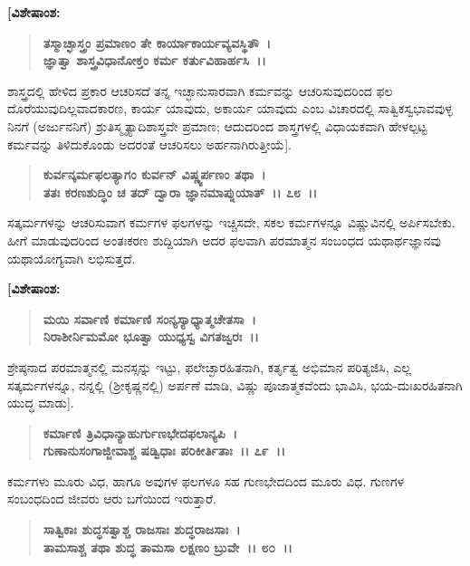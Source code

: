 \begin{flushleft}
\textbf{[ವಿಶೇಷಾಂಶ:} 
\end{flushleft}

\begin{verse}
\textbf{ತಸ್ಮಾಚ್ಛಾಸ್ತ್ರಂ ಪ್ರಮಾಣಂ ತೇ ಕಾರ್ಯಾಕಾರ್ಯವ್ಯವಸ್ಥಿತೌ~।}\\\textbf{ಜ್ಞಾತ್ವಾ ಶಾಸ್ತ್ರವಿಧಾನೋಕ್ತಂ ಕರ್ಮ ಕರ್ತುವಿಹಾರ್ಹಸಿ~।।} 
\end{verse}

ಶಾಸ್ತ್ರದಲ್ಲಿ ಹೇಳಿದ ಪ್ರಕಾರ ಆಚರಿಸದೆ ತನ್ನ ಇಚ್ಛಾನುಸಾರವಾಗಿ ಕರ್ಮವನ್ನು ಆಚರಿಸುವುದರಿಂದ ಫಲ ದೊರೆಯುವುದಿಲ್ಲವಾದಕಾರಣ, ಕಾರ್ಯ ಯಾವುದು, ಅಕಾರ್ಯ ಯಾವುದು ಎಂಬ ವಿಚಾರದಲ್ಲಿ ಸಾತ್ವಿಕಸ್ವಭಾವವುಳ್ಳ ನಿನಗೆ (ಅರ್ಜುನನಿಗೆ) ಶ್ರುತಿಸ್ಮೃತ್ಯಾದಿಶಾಸ್ತ್ರವೇ ಪ್ರಮಾಣ; ಆದುದರಿಂದ ಶಾಸ್ತ್ರಗಳಲ್ಲಿ ವಿಧಾಯಕವಾಗಿ ಹೇಳಲ್ಪಟ್ಟ ಕರ್ಮವನ್ನು ತಿಳಿದುಕೊಂಡು ಅದರಂತೆ ಆಚರಿಸಲು ಅರ್ಹನಾಗಿರುತ್ತೀಯೆ].

\begin{verse}
\textbf{ಕುರ್ವನ್ಕರ್ಮಫಲತ್ಯಾಗಂ ಕುರ್ವನ್ ವಿಷ್ಣ್ವರ್ಪಣಂ ತಥಾ~।}\\\textbf{ತತಃ ಕರಣಶುದ್ಧಿಂ ಚ ತದ್ ದ್ವಾರಾ ಜ್ಞಾನಮಾಪ್ನುಯಾತ್~।। ೭೮~।।}
\end{verse}

ಸತ್ಕರ್ಮಗಳನ್ನು ಆಚರಿಸುವಾಗ ಕರ್ಮಗಳ ಫಲಗಳನ್ನು ಇಚ್ಚಿಸದೇ, ಸಕಲ ಕರ್ಮಗಳನ್ನೂ ವಿಷ್ಣುವಿನಲ್ಲಿ ಅರ್ಪಿಸಬೇಕು. ಹೀಗೆ ಮಾಡುವುದರಿಂದ ಅಂತಃಕರಣ ಶುದ್ದಿಯಾಗಿ ಅದರ ಫಲವಾಗಿ ಪರಮಾತ್ಮನ ಸಂಬಂಧದ ಯಥಾರ್ಥಜ್ಞಾನವು ಯಥಾಯೋಗ್ಯವಾಗಿ ಲಭಿಸುತ್ತದೆ.

\begin{flushleft}
\textbf{[ವಿಶೇಷಾಂಶ:} 
\end{flushleft}

\begin{verse}
\textbf{ಮಯಿ ಸರ್ವಾಣಿ ಕರ್ಮಾಣಿ ಸಂನ್ಯಸ್ಯಾಧ್ಯಾತ್ಮಚೇತಸಾ~।}\\\textbf{ನಿರಾಶೀರ್ನಿಮಮೋ ಭೂತ್ವಾ ಯುಧ್ಯಸ್ವ ವಿಗತಜ್ವರಃ~।।} 
\end{verse}

ಶ್ರೇಷ್ಠನಾದ ಪರಮಾತ್ಮನಲ್ಲಿ ಮನಸ್ಸನ್ನು ಇಟ್ಟು, ಫಲೇಚ್ಛಾರಹಿತನಾಗಿ, ಕರ್ತೃತ್ವ ಅಭಿಮಾನ ಪರಿತ್ಯಜಿಸಿ, ಎಲ್ಲ ಸತ್ಕರ್ಮಗಳನ್ನೂ, ನನ್ನಲ್ಲಿ (ಶ‍್ರೀಕೃಷ್ಣನಲ್ಲಿ) ಅರ್ಪಣೆ ಮಾಡಿ, ವಿಷ್ಣು ಪೂಜಾತ್ಮಕವೆಂದು ಭಾವಿಸಿ, ಭಯ-ದುಃಖರಹಿತನಾಗಿ ಯುದ್ಧ ಮಾಡು].

\begin{verse}
\textbf{ಕರ್ಮಾಣಿ ತ್ರಿವಿಧಾನ್ಯಾಹುರ್ಗುಣಭೇದಫಲಾನ್ಯಪಿ~।}\\\textbf{ಗುಣಾನುಸಂಗಾಜ್ಜೀವಾಶ್ಚ ಷಡ್ವಿಧಾಃ ಪರಿಕೀರ್ತಿತಾಃ~।। ೭೯~।।}
\end{verse}

ಕರ್ಮಗಳು ಮೂರು ವಿಧ, ಹಾಗೂ ಅವುಗಳ ಫಲಗಳೂ ಸಹ ಗುಣಭೇದದಿಂದ ಮೂರು ವಿಧ. ಗುಣಗಳ ಸಂಬಂಧದಿಂದ ಜೀವರು ಆರು ಬಗೆಯಿಂದ ಇರುತ್ತಾರೆ.

\begin{verse}
\textbf{ಸಾತ್ವಿಕಾಃ ಶುದ್ಧಸತ್ವಾಶ್ಚ ರಾಜಸಾಃ ಶುದ್ಧರಾಜಸಾಃ~।}\\\textbf{ತಾಮಸಾಶ್ಚ ತಥಾ ಶುದ್ಧ ತಾಮಸಾ ಲಕ್ಷಣಂ ಬ್ರುವೇ~।। ೮೦~।।}
\end{verse}

